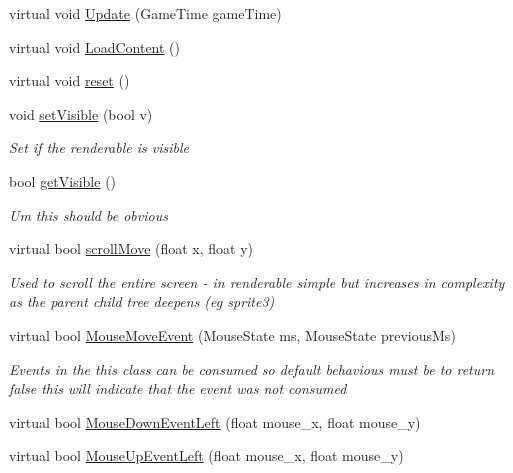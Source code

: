 \begin{DoxyCompactItemize}
virtual void \mbox{\hyperlink{class_r_c___framework_1_1_r_c___renderable_a5745bedc7ba0587aa1e1d8563c357228}{Update}} (Game\+Time game\+Time)
\item 
virtual void \mbox{\hyperlink{class_r_c___framework_1_1_r_c___renderable_ae5283e88f2cc34c2ef010ede22ab1bfb}{Load\+Content}} ()
\item 
virtual void \mbox{\hyperlink{class_r_c___framework_1_1_r_c___renderable_ae65ce69704d15963789f421b58618b1f}{reset}} ()
\item 
void \mbox{\hyperlink{class_r_c___framework_1_1_r_c___renderable_a3fc6f1efc5735fb15ad0a02b1b821a62}{set\+Visible}} (bool v)
\begin{DoxyCompactList}\small\item\em Set if the renderable is visible \end{DoxyCompactList}\item 
bool \mbox{\hyperlink{class_r_c___framework_1_1_r_c___renderable_a6258a044f185b02adb80d441fd9f29b2}{get\+Visible}} ()
\begin{DoxyCompactList}\small\item\em Um this should be obvious \end{DoxyCompactList}\item 
virtual bool \mbox{\hyperlink{class_r_c___framework_1_1_r_c___renderable_a21e5b1a68c7382443c82e7296fd2209a}{scroll\+Move}} (float x, float y)
\begin{DoxyCompactList}\small\item\em Used to scroll the entire screen -\/ in renderable simple but increases in complexity as the parent child tree deepens (eg sprite3) \end{DoxyCompactList}\item 
virtual bool \mbox{\hyperlink{class_r_c___framework_1_1_r_c___renderable_a64771aae3018662ed596c01ee36fb87f}{Mouse\+Move\+Event}} (Mouse\+State ms, Mouse\+State previous\+Ms)
\begin{DoxyCompactList}\small\item\em Events in the this class can be consumed so default behavious must be to return false this will indicate that the event was not consumed \end{DoxyCompactList}\item 
virtual bool \mbox{\hyperlink{class_r_c___framework_1_1_r_c___renderable_a41d144d6fad27f219d861e61a2d9796e}{Mouse\+Down\+Event\+Left}} (float mouse\+\_\+x, float mouse\+\_\+y)
\item 
virtual bool \mbox{\hyperlink{class_r_c___framework_1_1_r_c___renderable_a9545f4486eacd645e0c6680976020950}{Mouse\+Up\+Event\+Left}} (float mouse\+\_\+x, float mouse\+\_\+y)

\end{DoxyCompactItemize}
